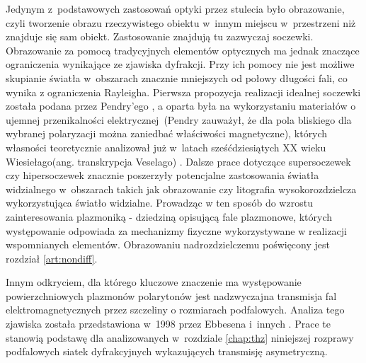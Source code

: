 
Jedynym z~podstawowych zastosowań optyki przez stulecia było obrazowanie, czyli tworzenie obrazu rzeczywistego obiektu w~innym miejscu w~przestrzeni niż znajduje się sam obiekt. Zastosowanie znajdują tu zazwyczaj soczewki. Obrazowanie za pomocą tradycyjnych elementów optycznych ma jednak znaczące ograniczenia wynikające ze zjawiska dyfrakcji. Przy ich pomocy nie jest możliwe skupianie światła w~obszarach znacznie mniejszych od połowy długości fali, co wynika z ograniczenia Rayleigha. Pierwsza propozycja realizacji idealnej soczewki została podana przez Pendry'ego \cite{PhysRevLett.85.3966,loschialpo2003electromagnetic,smith2003limitations,ramakrishna2002asymmetric}, a oparta była na wykorzystaniu materiałów o ujemnej przenikalności elektrycznej~(Pendry zauważył, że dla pola bliskiego dla wybranej polaryzacji można zaniedbać właściwości magnetyczne), których własności teoretycznie analizował już w~latach sześćdziesiątych XX wieku Wiesiełago(ang. transkrypcja Veselago) \cite{veselago1968electrodynamics}. Dalsze prace dotyczące supersoczewek czy hipersoczewek \cite{liu2007far,jacob2006optical,jacob2007semiclassical,ma2010advances,rho2010spherical} znacznie poszerzyły potencjalne zastosowania światła widzialnego w~obszarach takich jak obrazowanie czy litografia wysokorozdzielcza wykorzystująca światło widzialne. Prowadząc w ten sposób do wzrostu zainteresowania plazmoniką - dziedziną opisującą fale plazmonowe, których występowanie odpowiada za mechanizmy fizyczne wykorzystywane w realizacji wspomnianych elementów. Obrazowaniu nadrozdzielczemu poświęcony jest rozdział \ref{art:nondiff}.

Innym odkryciem, dla którego kluczowe znaczenie ma występowanie powierzchniowych plazmonów polarytonów jest nadzwyczajna transmisja fal elektromagnetycznych przez szczeliny o rozmiarach podfalowych. Analiza tego zjawiska została przedstawiona w~1998 przez Ebbesena i~innych \cite{ebbesen1998extraordinary}. Prace te stanowią podstawę dla analizowanych w~rozdziale \ref{chap:thz} niniejszej rozprawy podfalowych siatek dyfrakcyjnych wykazujących transmisję asymetryczną.

